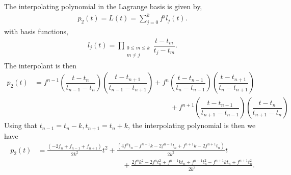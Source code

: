 \documentclass[12pt]{article}
\begin{document}
The interpolating polynomial in the Lagrange basis is given by, 
\begin{align}
	p_{2}(t) = L(t) = \sum_{j=0}^{k}f^{j}l_{j}(t).
\end{align}
with basis functions,
\begin{align}
	l_{j}(t) = \prod_{\substack{0\le m\le k \\ m\neq j}}\dfrac{t-t_{m}}{t_{j}-t_{m}}.
\end{align}
The interpolant is then
\begin{align}
	p_{2}(t) &= f^{n-1}\left(\dfrac{t-t_{n}}{t_{n-1}-t_{n}}\right)\left(\dfrac{t-t_{n+1}}{t_{n-1}-t_{n+1}}\right) +  f^{n}\left(\dfrac{t-t_{n-1}}{t_{n}-t_{n-1}}\right)\left(\dfrac{t-t_{n+1}}{t_{n}-t_{n+1}}\right) \nonumber\\
	&\hspace{8cm}+ 
	f^{n+1}\left(\dfrac{t-t_{n-1}}{t_{n+1}-t_{n-1}}\right)\left(\dfrac{t-t_{n}}{t_{n+1}-t_{n}}\right)
\end{align}
Using that $t_{n-1}=t_{n}-k,t_{n+1}=t_{n}+k$, the interpolating polynomial is then we have
\begin{align}
	p_{2}(t) &= \frac{(-2 f_{n}+f_{n-1}+f_{n+1})}{2 k^2}t^{2}+\frac{(4 f^{n}t_{n}-f^{n-1} k-2 f^{n-1} t_{n}+f^{n+1} k-2 f^{n+1}t_{n})}{2 k^2}t \nonumber\\
    &\hspace{5cm}+\frac{2 f^{n} k^2-2 f^{n} t_{n}^2+f^{n-1} kt_{n}+f^{n-1} t_{n}^2-f^{n+1} k t_{n}+f^{n+1} t_{n}^2}{2k^2}.
\end{align}

\newpage
\end{document}
